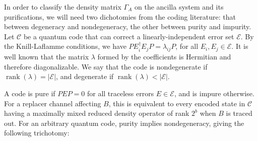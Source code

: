 \documentclass[]{amsart}
\DeclareMathOperator{\rank}{rank}
\begin{document}
In order to classify the density matrix $\Gamma_A$ on the ancilla system and its purifications, we will need two dichotomies from the coding literature: that between degeneracy and nondegeneracy, the other between purity and impurity.
Let $\mathcal{C}$ be a quantum code that can correct a linearly-independent error set $\mathcal{E}$.
By the Knill-Laflamme conditions, we have $PE_i^\dagger E_jP=\lambda_{ij}P$, for all $E_i,E_j\in \mathcal{E}$.
It is well known that the matrix $\lambda$ formed by the coefficients is Hermitian and therefore diagonalizable.
We say that the code is nondegenerate if $\rank\!\left(\lambda\right)=\left\lvert\mathcal{E}\right\rvert$, and degenerate if $\rank\!\left(\lambda\right)<\left\lvert\mathcal{E}\right\rvert$.

A code is pure if $PEP=0$ for all traceless errors $E\in\mathcal{E}$, and is impure otherwise.
For a replacer channel affecting $B$, this is equivalent to every encoded state in $\mathcal{C}$ having a maximally mixed reduced density operator of rank $2^b$ when $B$ is traced out.
For an arbitrary quantum code, purity implies nondegeneracy, giving the following trichotomy:
\end{document}
